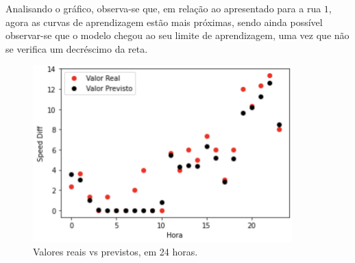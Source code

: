 \documentclass[a4paper, 12pt]{article}
\begin{document}
Analisando o gráfico, observa-se que, em relação ao apresentado para a rua $1$, agora as curvas de aprendizagem estão mais próximas, sendo ainda possível observar-se que o modelo chegou ao seu limite de aprendizagem, uma vez que não se verifica um decréscimo da reta.

\begin{figure}[H]
	\centering
	\includegraphics[width=10cm]{resultados/real_prev_2.png}
	\caption{Valores reais vs previstos, em 24 horas.}
\end{figure}
\end{document}
